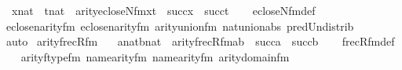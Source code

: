 \begin{isabellebody}
\ \ {\isachardoublequoteopen}{\isasymlbrakk}x{\isasymin}nat\ {\isacharsemicolon}{\kern0pt}\ t{\isasymin}nat{\isasymrbrakk}\ {\isasymLongrightarrow}\ arity{\isacharparenleft}{\kern0pt}ecloseN{\isacharunderscore}{\kern0pt}fm{\isacharparenleft}{\kern0pt}x{\isacharcomma}{\kern0pt}t{\isacharparenright}{\kern0pt}{\isacharparenright}{\kern0pt}\ {\isacharequal}{\kern0pt}\ succ{\isacharparenleft}{\kern0pt}x{\isacharparenright}{\kern0pt}\ {\isasymunion}\ succ{\isacharparenleft}{\kern0pt}t{\isacharparenright}{\kern0pt}{\isachardoublequoteclose}\isanewline
%
\isadelimproof
\ \ %
\endisadelimproof
%
\isatagproof
{}\isamarkupfalse%
\ ecloseN{\isacharunderscore}{\kern0pt}fm{\isacharunderscore}{\kern0pt}def\ \isanewline
\ \ \isamarkupfalse%
\ eclose{\isacharunderscore}{\kern0pt}n{}arity{\isacharunderscore}{\kern0pt}{\isacharunderscore}{\kern0pt}fm\ eclose{\isacharunderscore}{\kern0pt}n{}arity{\isacharunderscore}{\kern0pt}{\isacharunderscore}{\kern0pt}fm\ arity{\isacharunderscore}{\kern0pt}union{\isacharunderscore}{\kern0pt}fm\ nat{\isacharunderscore}{\kern0pt}union{\isacharunderscore}{\kern0pt}abs{}\ pred{\isacharunderscore}{\kern0pt}Un{\isacharunderscore}{\kern0pt}distrib\isanewline
\ \ \isamarkupfalse%
\ auto%
\endisatagproof
{\isafoldproof}%
%
\isadelimproof
\isanewline
%
\endisadelimproof
\isanewline
{}\isamarkupfalse%
\ arity{\isacharunderscore}{\kern0pt}frecR{\isacharunderscore}{\kern0pt}fm\ {\isacharcolon}{\kern0pt}\isanewline
\ \ {\isachardoublequoteopen}{\isasymlbrakk}a{\isasymin}nat{\isacharsemicolon}{\kern0pt}b{\isasymin}nat{\isasymrbrakk}\ {\isasymLongrightarrow}\ arity{\isacharparenleft}{\kern0pt}frecR{\isacharunderscore}{\kern0pt}fm{\isacharparenleft}{\kern0pt}a{\isacharcomma}{\kern0pt}b{\isacharparenright}{\kern0pt}{\isacharparenright}{\kern0pt}\ {\isacharequal}{\kern0pt}\ succ{\isacharparenleft}{\kern0pt}a{\isacharparenright}{\kern0pt}\ {\isasymunion}\ succ{\isacharparenleft}{\kern0pt}b{\isacharparenright}{\kern0pt}{\isachardoublequoteclose}\isanewline
%
\isadelimproof
\ \ %
\endisadelimproof
%
\isatagproof
{}\isamarkupfalse%
\ frecR{\isacharunderscore}{\kern0pt}fm{\isacharunderscore}{\kern0pt}def\isanewline
\ \ \isamarkupfalse%
\ arity{\isacharunderscore}{\kern0pt}ftype{\isacharunderscore}{\kern0pt}fm\ name{}arity{\isacharunderscore}{\kern0pt}{\isacharunderscore}{\kern0pt}fm\ name{}arity{\isacharunderscore}{\kern0pt}{\isacharunderscore}{\kern0pt}fm\ arity{\isacharunderscore}{\kern0pt}domain{\isacharunderscore}{\kern0pt}fm\ \isanewline

\end{isabellebody}
